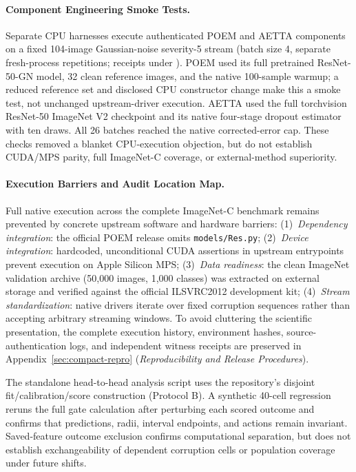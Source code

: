 \paragraph{Component Engineering Smoke Tests.}
Separate CPU harnesses execute authenticated POEM and AETTA components on a fixed 104-image
Gaussian-noise severity-5 stream (batch size 4, separate fresh-process repetitions; receipts under
). POEM used its full pretrained ResNet-50-GN model,
32 clean reference images, and the native 100-sample warmup; a reduced reference set and disclosed CPU
constructor change make this a smoke test, not unchanged upstream-driver execution. AETTA used the full
torchvision ResNet-50 ImageNet V2 checkpoint and its native four-stage dropout estimator with ten draws.
All 26 batches reached the native corrected-error cap. These checks removed a blanket CPU-execution objection,
but do not establish CUDA/MPS parity, full ImageNet-C coverage, or external-method superiority.

\paragraph{Execution Barriers and Audit Location Map.}
Full native execution across the complete ImageNet-C benchmark remains prevented by concrete upstream
software and hardware barriers: (1)~\emph{Dependency integration}: the official POEM release omits
\texttt{models/Res.py}; (2)~\emph{Device integration}: hardcoded, unconditional CUDA assertions in upstream
entrypoints prevent execution on Apple Silicon MPS; (3)~\emph{Data readiness}: the clean ImageNet validation
archive (50,000 images, 1,000 classes) was extracted on external storage and verified against the official
ILSVRC2012 development kit; (4)~\emph{Stream standardization}: native drivers iterate over fixed corruption
sequences rather than accepting arbitrary streaming windows.
To avoid cluttering the scientific presentation, the complete execution history, environment hashes,
source-authentication logs, and independent witness receipts are preserved in
Appendix~\ref{sec:compact-repro} (\emph{Reproducibility and Release Procedures}).

The standalone head-to-head analysis script uses the repository's disjoint fit/calibration/score
construction (Protocol B). A synthetic 40-cell regression reruns the full gate calculation after perturbing
each scored outcome and confirms that predictions, radii, interval endpoints, and actions remain invariant.
Saved-feature outcome exclusion confirms computational separation, but does not establish exchangeability
of dependent corruption cells or population coverage under future shifts.

